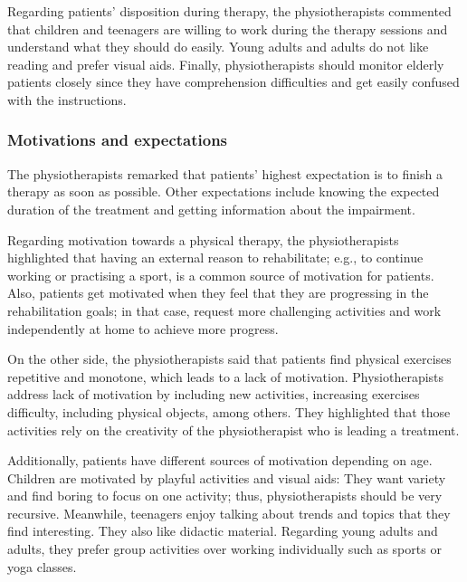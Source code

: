 Regarding patients' disposition during therapy, the physiotherapists commented that children and teenagers are willing to work during the therapy sessions and understand what they should do easily. Young adults and adults do not like reading and prefer visual aids. Finally, physiotherapists should monitor elderly patients closely since they have comprehension difficulties and get easily confused with the instructions.

\subsubsection{Motivations and expectations}

The physiotherapists remarked that patients' highest expectation is to finish a therapy as soon as possible. Other expectations include knowing the expected duration of the treatment and getting information about the impairment.

Regarding motivation towards a physical therapy, the physiotherapists highlighted that having an external reason to rehabilitate; e.g., to continue working or practising a sport, is a common source of motivation for patients. Also, patients get motivated when they feel that they are progressing in the rehabilitation goals; in that case, request more challenging activities and work independently at home to achieve more progress.

On the other side, the physiotherapists said that patients find physical exercises repetitive and monotone, which leads to a lack of motivation. Physiotherapists address lack of motivation by including new activities, increasing exercises difficulty, including physical objects, among others. They highlighted that those activities rely on the creativity of the physiotherapist who is leading a treatment.

Additionally, patients have different sources of motivation depending on age. Children are motivated by playful activities and visual aids: They want variety and find boring to focus on one activity; thus, physiotherapists should be very recursive. Meanwhile, teenagers enjoy talking about trends and topics that they find interesting. They also like didactic material. Regarding young adults and adults, they prefer group activities over working individually such as sports or yoga classes.

